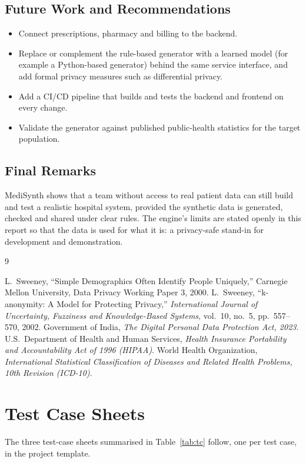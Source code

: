\documentclass{tietreport}
\begin{document}
\section{Future Work and Recommendations}

\begin{itemize}
  \item Connect prescriptions, pharmacy and billing to the backend.
  \item Replace or complement the rule-based generator with a learned model
    (for example a Python-based generator) behind the same service interface,
    and add formal privacy measures such as differential privacy.
  \item Add a CI/CD pipeline that builds and tests the backend and frontend
    on every change.
  \item Validate the generator against published public-health statistics for
    the target population.
\end{itemize}

\section{Final Remarks}

MediSynth shows that a team without access to real patient data can still
build and test a realistic hospital system, provided the synthetic data is
generated, checked and shared under clear rules. The engine's limits are
stated openly in this report so that the data is used for what it is: a
privacy-safe stand-in for development and demonstration.


\begin{thebibliography}{9}
 L.~Sweeney, ``Simple Demographics Often Identify People
  Uniquely,'' Carnegie Mellon University, Data Privacy Working Paper 3, 2000.
 L.~Sweeney, ``k-anonymity: A Model for Protecting
  Privacy,'' \emph{International Journal of Uncertainty, Fuzziness and
  Knowledge-Based Systems}, vol.~10, no.~5, pp.~557--570, 2002.
 Government of India, \emph{The Digital Personal Data Protection
  Act, 2023}.
 U.S.\ Department of Health and Human Services, \emph{Health
  Insurance Portability and Accountability Act of 1996 (HIPAA)}.
 World Health Organization, \emph{International Statistical
  Classification of Diseases and Related Health Problems, 10th Revision
  (ICD-10)}.
\end{thebibliography}


\appendix
\chapter{Test Case Sheets}
The three test-case sheets summarised in Table~\ref{tab:tc} follow, one per test case, in the project template.


\end{document}
